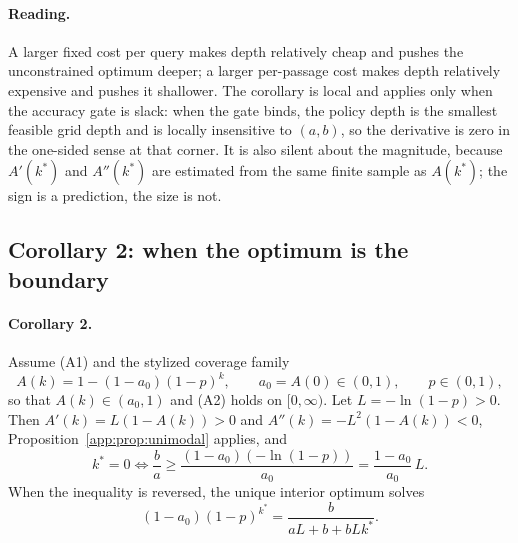 \paragraph{Reading.} A larger fixed cost per query makes depth relatively cheap
and pushes the unconstrained optimum deeper; a larger per-passage cost makes
depth relatively expensive and pushes it shallower. The corollary is local and
applies only when the accuracy gate is slack: when the gate binds, the policy
depth is the smallest feasible grid depth and is locally insensitive to $(a,b)$,
so the derivative is zero in the one-sided sense at that corner. It is also
silent about the magnitude, because $A'(k^{*})$ and $A''(k^{*})$ are estimated
from the same finite sample as $A(k^{*})$; the sign is a prediction, the size is
not.

\subsection{Corollary 2: when the optimum is the boundary}\label{app:cor:boundary}

\paragraph{Corollary 2.} Assume (A1) and the stylized coverage family
\begin{equation}\label{app:eq:coverage}
  A(k)=1-(1-a_{0})(1-p)^{k},
  \qquad
  a_{0}=A(0)\in(0,1),
  \qquad
  p\in(0,1),
\end{equation}
so that $A(k)\in(a_{0},1)$ and (A2) holds on $[0,\infty)$. Let
$L=-\ln(1-p)>0$. Then $A'(k)=L\left(1-A(k)\right)>0$ and
$A''(k)=-L^{2}\left(1-A(k)\right)<0$, Proposition~\ref{app:prop:unimodal}
applies, and
\begin{equation}\label{app:eq:boundary}
  k^{*}=0
  \iff
  \frac{b}{a}\ge\frac{(1-a_{0})\left(-\ln(1-p)\right)}{a_{0}}
  =\frac{1-a_{0}}{a_{0}}\,L .
\end{equation}
When the inequality is reversed, the unique interior optimum solves
\begin{equation}\label{app:eq:coverage-optimum}
  (1-a_{0})(1-p)^{k^{*}}=\frac{b}{aL+b+bLk^{*}} .
\end{equation}

